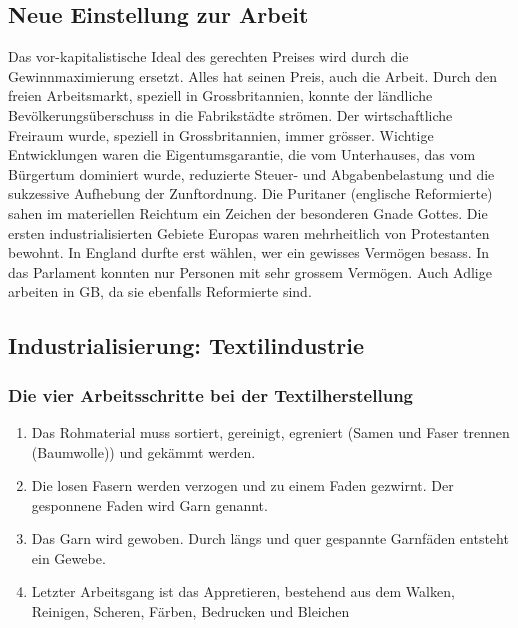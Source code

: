 \documentclass[10pt, openright=true]{scrartcl}
\begin{document}
\subsection{Neue Einstellung zur Arbeit}
Das vor-kapitalistische Ideal des \glqq gerechten Preises \grqq wird durch die Gewinnmaximierung ersetzt. Alles hat seinen Preis, auch die Arbeit. Durch den freien Arbeitsmarkt, speziell in Grossbritannien, konnte der ländliche Bevölkerungsüberschuss in die Fabrikstädte strömen. Der wirtschaftliche Freiraum wurde, speziell in Grossbritannien, immer grösser. Wichtige Entwicklungen waren die Eigentumsgarantie, die vom Unterhauses, das vom Bürgertum dominiert wurde, reduzierte Steuer- und Abgabenbelastung und die sukzessive Aufhebung der Zunftordnung. Die Puritaner (englische Reformierte) sahen im materiellen Reichtum ein Zeichen der besonderen Gnade Gottes. Die ersten industrialisierten Gebiete Europas waren mehrheitlich von Protestanten bewohnt. In England durfte erst wählen, wer ein gewisses Vermögen besass. In das Parlament konnten nur Personen mit sehr grossem Vermögen. Auch Adlige arbeiten in GB, da sie ebenfalls Reformierte sind.
\subsection{Industrialisierung: Textilindustrie}
\subsubsection{Die vier Arbeitsschritte bei der Textilherstellung}
\begin{enumerate}
\item Das Rohmaterial muss sortiert, gereinigt, egreniert (Samen und Faser trennen (Baumwolle)) und gekämmt werden.
\item Die losen Fasern werden verzogen und zu einem Faden gezwirnt. Der gesponnene Faden wird Garn genannt.
\item Das Garn wird gewoben. Durch längs und quer gespannte Garnfäden entsteht ein Gewebe.
\item Letzter Arbeitsgang ist das Appretieren, bestehend aus dem Walken, Reinigen, Scheren, Färben, Bedrucken und Bleichen
\end{enumerate}
\end{document}

